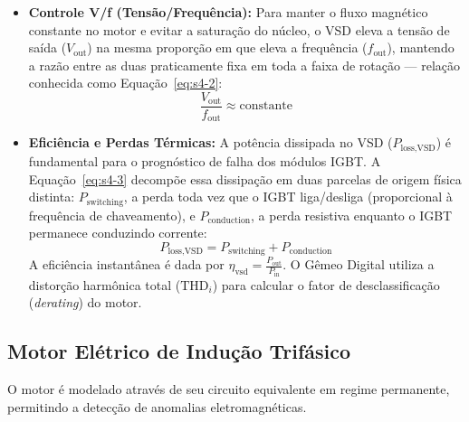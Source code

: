 \documentclass[12pt,a4paper]{article}
\numberwithin{equation}{section}
\numberwithin{table}{section}
\numberwithin{figure}{section}
\begin{document}
	\begin{itemize}
		\item \textbf{Controle V/f (Tensão/Frequência):} Para manter o fluxo magnético constante no motor e evitar a saturação do núcleo, o VSD eleva a tensão de saída ($V_{\text{out}}$) na mesma proporção em que eleva a frequência ($f_{\text{out}}$), mantendo a razão entre as duas praticamente fixa em toda a faixa de rotação — relação conhecida como Equação~\eqref{eq:s4-2}:
		\begin{equation}\label{eq:s4-2}
 \frac{V_{\text{out}}}{f_{\text{out}}} \approx \text{constante}
\end{equation}
		\item \textbf{Eficiência e Perdas Térmicas:} A potência dissipada no VSD ($P_{\text{loss,VSD}}$) é fundamental para o prognóstico de falha dos módulos IGBT. A Equação~\eqref{eq:s4-3} decompõe essa dissipação em duas parcelas de origem física distinta: $P_{\text{switching}}$, a perda toda vez que o IGBT liga/desliga (proporcional à frequência de chaveamento), e $P_{\text{conduction}}$, a perda resistiva enquanto o IGBT permanece conduzindo corrente:
		\begin{equation}\label{eq:s4-3}
 P_{\text{loss,VSD}} = P_{\text{switching}} + P_{\text{conduction}}
\end{equation}
		A eficiência instantânea é dada por $\eta_{\text{vsd}} = \frac{P_{\text{out}}}{P_{\text{in}}}$. O Gêmeo Digital utiliza a distorção harmônica total ($\text{THD}_i$) para calcular o fator de desclassificação (\textit{derating}) do motor.
	\end{itemize}
	
	\subsection{\textbf{Motor Elétrico de Indução Trifásico}}
	O motor é modelado através de seu circuito equivalente em regime permanente, permitindo a detecção de anomalias eletromagnéticas.
	
\end{document}
